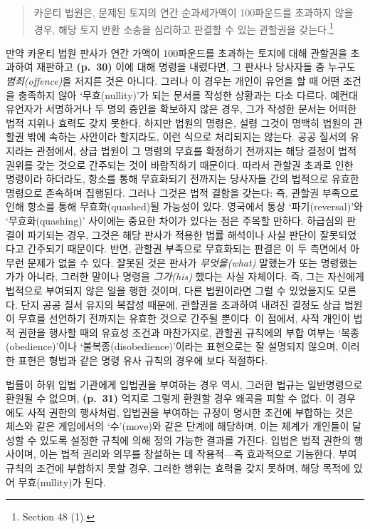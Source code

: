 \documentclass[12pt, oneside]{book}  %
\begin{document}
\begin{quote}
카운티 법원은, 문제된 토지의 연간 순과세가액이 100파운드를 초과하지 않을
경우, 해당 토지 반환 소송을 심리하고 판결할 수 있는 관할권을
갖는다.\footnote{Section 48 (1).}
\end{quote}

만약 카운티 법원 판사가 연간 가액이 100파운드를 초과하는 토지에 대해
관할권을 초과하여 재판하고 \textbf{(p.~30)} 이에 대해 명령을 내렸다면,
그 판사나 당사자들 중 누구도 \emph{범죄(offence)}을 저지른 것은 아니다.
그러나 이 경우는 개인이 유언을 할 때 어떤 조건을 충족하지 않아
`무효(nullity)'가 되는 문서를 작성한 상황과는 다소 다르다. 예컨대
유언자가 서명하거나 두 명의 증인을 확보하지 않은 경우, 그가 작성한
문서는 어떠한 법적 지위나 효력도 갖지 못한다. 하지만 법원의 명령은, 설령
그것이 명백히 법원의 관할권 밖에 속하는 사안이라 할지라도, 이런 식으로
처리되지는 않는다. 공공 질서의 유지라는 관점에서, 상급 법원이 그 명령의
무효를 확정하기 전까지는 해당 결정이 법적 권위를 갖는 것으로 간주되는
것이 바람직하기 때문이다. 따라서 관할권 초과로 인한 명령이라 하더라도,
항소를 통해 무효화되기 전까지는 당사자들 간의 법적으로 유효한 명령으로
존속하며 집행된다. 그러나 그것은 법적 결함을 갖는다: 즉, 관할권 부족으로
인해 항소를 통해 무효화(quashed)될 가능성이 있다. 영국에서 통상
`파기(reversal)'와 `무효화(quashing)' 사이에는 중요한 차이가 있다는 점은
주목할 만하다. 하급심의 판결이 파기되는 경우, 그것은 해당 판사가 적용한
법률 해석이나 사실 판단이 잘못되었다고 간주되기 때문이다. 반면, 관할권
부족으로 무효화되는 판결은 이 두 측면에서 아무런 문제가 없을 수 있다.
잘못된 것은 판사가 \emph{무엇을(what)} 말했는가 또는 명령했는가가
아니라, 그러한 말이나 명령을 \emph{그가(his)} 했다는 사실 자체이다. 즉,
그는 자신에게 법적으로 부여되지 않은 일을 행한 것이며, 다른 법원이라면
그럴 수 있었을지도 모른다. 단지 공공 질서 유지의 복잡성 때문에, 관할권을
초과하여 내려진 결정도 상급 법원이 무효를 선언하기 전까지는 유효한
것으로 간주될 뿐이다. 이 점에서, 사적 개인이 법적 권한을 행사할 때의
유효성 조건과 마찬가지로, 관할권 규칙에의 부합 여부는
`복종(obedience)'이나 `불복종(disobedience)'이라는 표현으로는 잘
설명되지 않으며, 이러한 표현은 형법과 같은 명령 유사 규칙의 경우에 보다
적절하다.

법률이 하위 입법 기관에게 입법권을 부여하는 경우 역시, 그러한 법규는
일반명령으로 환원될 수 없으며, \textbf{(p.~31)} 억지로 그렇게 환원할
경우 왜곡을 피할 수 없다. 이 경우에도 사적 권한의 행사처럼, 입법권을
부여하는 규정이 명시한 조건에 부합하는 것은 체스와 같은 게임에서의
`수'(move)와 같은 단계에 해당하며, 이는 체계가 개인들이 달성할 수 있도록
설정한 규칙에 의해 정의 가능한 결과를 가진다. 입법은 법적 권한의
행사이며, 이는 법적 권리와 의무를 창설하는 데 작용적---즉 효과적으로
기능한다. 부여 규칙의 조건에 부합하지 못할 경우, 그러한 행위는 효력을
갖지 못하며, 해당 목적에 있어 무효(nullity)가 된다.
\end{document}
